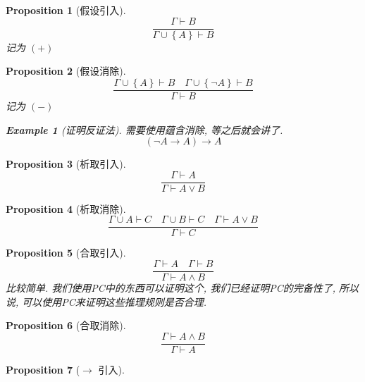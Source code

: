 \documentclass[12pt, a4paper]{ctexart} %
\theoremstyle{plain}
\newtheorem{proposition}{Proposition}[section]
\theoremstyle{definition}
\newtheorem{example}{Example}[section]
\begin{document}
\begin{proposition}[假设引入]
    \begin{equation}
        \frac{\Gamma \vdash  B   }{ \Gamma \cup \left\{A\right\} \vdash  B}
    \end{equation}
    记为 $\left(+ \right)$
\end{proposition}
\begin{proposition}[假设消除]
    \begin{equation}
        \frac{\Gamma \cup \left\{A\right\}\vdash B \quad \Gamma \cup  \left\{\neg A\right\} \vdash B}{\Gamma \vdash B}
    \end{equation}
    记为 $\left(-\right)$
    \begin{example}[证明反证法]
        需要使用蕴含消除, 等之后就会讲了. 
        \begin{equation}
            \left(\neg A \to A\right) \to A 
        \end{equation}
    \end{example}
\end{proposition}
\begin{proposition}[析取引入]
    \begin{equation}
        \frac{\Gamma \vdash A}{\Gamma \vdash A\vee B}
    \end{equation}
\end{proposition}
\begin{proposition}[析取消除]
\begin{equation}
    \frac{\Gamma \cup A \vdash  C \quad \Gamma \cup  B \vdash C \quad \Gamma \vdash A \vee B}{\Gamma \vdash C}
\end{equation}
\end{proposition}
\begin{proposition}[合取引入]
\begin{equation}
    \frac{\Gamma \vdash A \quad \Gamma \vdash B}{\Gamma \vdash A \wedge B}
\end{equation}
比较简单. 我们使用PC中的东西可以证明这个, 我们已经证明PC的完备性了, 所以说, 可以使用PC来证明这些推理规则是否合理. 
\end{proposition}
\begin{proposition}[合取消除]
\begin{equation}
\frac{\Gamma \vdash A\wedge B   }{\Gamma \vdash  A}
\end{equation}
\end{proposition}
\begin{proposition}[$\rightarrow$ 引入]
\end{proposition}
\end{document}

